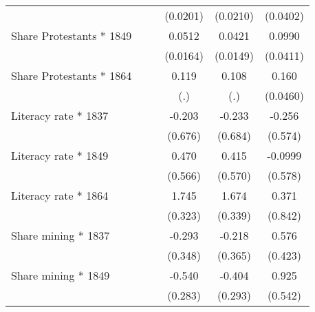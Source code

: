 {\begin{tabular}{l*{5}{c}}
                    &                     &                     &    (0.0201)         &    (0.0210)         &    (0.0402)         \\
Share Protestants * 1849&                     &                     &      0.0512\sym{***}&      0.0421\sym{***}&      0.0990\sym{**} \\
                    &                     &                     &    (0.0164)         &    (0.0149)         &    (0.0411)         \\
Share Protestants * 1864&                     &                     &       0.119         &       0.108         &       0.160\sym{***}\\
                    &                     &                     &         (.)         &         (.)         &    (0.0460)         \\
Literacy rate * 1837&                     &                     &      -0.203         &      -0.233         &      -0.256         \\
                    &                     &                     &     (0.676)         &     (0.684)         &     (0.574)         \\
Literacy rate * 1849&                     &                     &       0.470         &       0.415         &     -0.0999         \\
                    &                     &                     &     (0.566)         &     (0.570)         &     (0.578)         \\
Literacy rate * 1864&                     &                     &       1.745\sym{***}&       1.674\sym{***}&       0.371         \\
                    &                     &                     &     (0.323)         &     (0.339)         &     (0.842)         \\
Share mining * 1837 &                     &                     &      -0.293         &      -0.218         &       0.576         \\
                    &                     &                     &     (0.348)         &     (0.365)         &     (0.423)         \\
Share mining * 1849 &                     &                     &      -0.540\sym{*}  &      -0.404         &       0.925\sym{*}  \\
                    &                     &                     &     (0.283)         &     (0.293)         &     (0.542)         \\

\end{tabular}}
